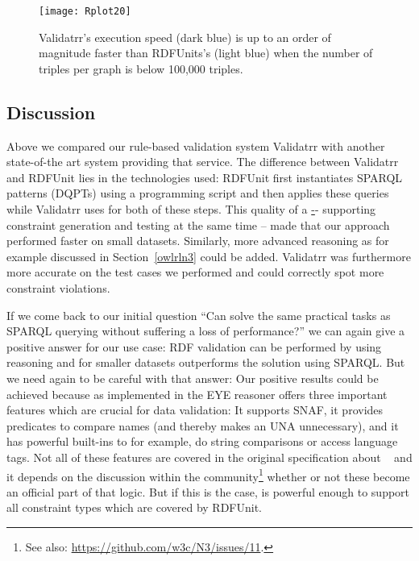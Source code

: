 \begin{figure}[t]
\begin{center}
    \texttt{[image: Rplot20]} %
\caption{Validatrr's execution speed (dark blue) is up to an order of magnitude faster than RDFUnits's (light blue) when the number of triples per \rdf graph is below 100,000 triples.}
	\label{fig:eval-size}
	\end{center}
\end{figure}


\subsection{Discussion}\label{conc}
Above we compared our rule-based \rdf validation system Validatrr with another state-of-the art system providing that service. The difference between Validatrr and RDFUnit 
lies in the technologies used: RDFUnit first instantiates SPARQL patterns (DQPTs) using a programming script and then applies these queries 
while Validatrr uses \nthreelogic for both of these steps. %
This quality of a \ul -- supporting constraint generation and testing at the same time -- made that our approach performed faster on small datasets. Similarly,
more advanced reasoning as for example
discussed in Section~\ref{owlrln3} could be added.
Validatrr was furthermore more accurate on the test cases we 
performed and could correctly spot more constraint violations.

If we come back to our initial question ``Can \nthree solve the same practical tasks as SPARQL querying without suffering a loss of performance?'' 
we can again give a positive answer for our use case: RDF validation can 
be performed by using \nthree reasoning and for smaller datasets \nthree outperforms the solution using SPARQL. 
But we need again to be careful with that answer: 
Our positive results could be achieved because \nthree as implemented in the EYE reasoner 
offers three important features which are crucial for data validation: It supports SNAF, it provides predicates to compare names (and thereby makes an UNA unnecessary), and it
has powerful built-ins to for example, 
do string comparisons or access language tags. Not all of these features are covered in the original specification 
about \nthreelogic~\cite{Notation3,N3Logic} and it depends on the discussion within the community\footnote{See also: \url{https://github.com/w3c/N3/issues/11}.} whether or not these
become an official part of that logic. But if this is the case, \nthree is powerful enough to support all constraint types which are covered by RDFUnit.


